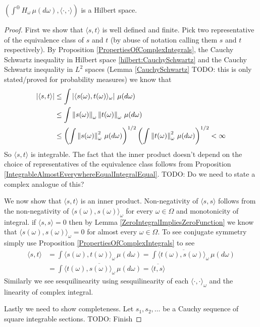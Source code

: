 \begin{prop}\label{hilbert:DirectIntegralIsHilbertSpace} $\left (\int^\oplus H_\omega \, \mu(d\omega), \langle \cdot, \cdot \rangle \right )$ is a Hilbert space.
\end{prop}
\begin{proof}
First we show that $\langle s, t \rangle$ is well defined and finite.  Pick two representative of the equivalence class of $s$ and $t$ (by abuse of notation calling them $s$ and $t$ respectively).  By Proposition \ref{PropertiesOfComplexIntegrals}, the Cauchy Schwartz inequality in Hilbert space \ref{hilbert:CauchySchwartz} and the Cauchy Schwartz inequality in $L^2$ spaces (Lemma \ref{CauchySchwartz} TODO: this is only stated/proved for probability measures) we know that 
\begin{align*}
\left \vert \langle s, t \rangle \right \vert &\leq \int \left \vert \langle s(\omega), t(\omega) \rangle_\omega \right \vert \, \mu(d\omega) \\
&\leq \int \left \lVert s(\omega) \right \rVert_\omega \left \lVert t(\omega) \right \rVert_\omega\, \mu(d\omega) \\
&\leq \left( \int \left \lVert s(\omega) \right \rVert^2_\omega \, \mu(d\omega) \right)^{1/2} \left(\int \left \lVert t(\omega) \right \rVert^2_\omega \, \mu(d\omega) \right)^{1/2} < \infty\\
\end{align*}
So $\langle s, t \rangle$ is integrable.  The fact that the inner product doesn't depend on the choice of representatives of the equivalence class follows from Proposition \ref{IntegrableAlmostEverywhereEqualIntegralEqual}.  TODO: Do we need to state a complex analogue of this?

We now show that $\langle s,t \rangle$ is an inner product.  Non-negativity of $\langle s, s \rangle$ follows from the non-negativity of $\langle s(\omega), s(\omega) \rangle_\omega$ for every $\omega \in \Omega$ and monotonicity of integral.  if $\langle s, s \rangle = 0$ then by Lemma \ref{ZeroIntegralImpliesZeroFunction} we know that $\langle s(\omega), s(\omega) \rangle_\omega = 0$ for almost every $\omega \in \Omega$.  To see conjugate symmetry simply use Proposition \ref{PropertiesOfComplexIntegrals} to see
\begin{align*}
\langle s, t \rangle &= \int \langle s(\omega), t(\omega) \rangle_\omega \, \mu(d\omega) = \int \overline{\langle t(\omega), s(\omega) \rangle_\omega} \, \mu(d\omega) \\
&= \overline{\int \langle t(\omega), s(\omega) \rangle_\omega\, \mu(d\omega)} = \overline{\langle t, s \rangle}
\end{align*}
Similarly we see sesquilinearity using sesquilinearity of each $\langle \cdot, \cdot \rangle_\omega$ and the linearity of complex integral.

Lastly we need to show completeness.  Let $s_1, s_2, \dotsc$ be a Cauchy sequence of square integrable sections.  TODO: Finish
\end{proof}

